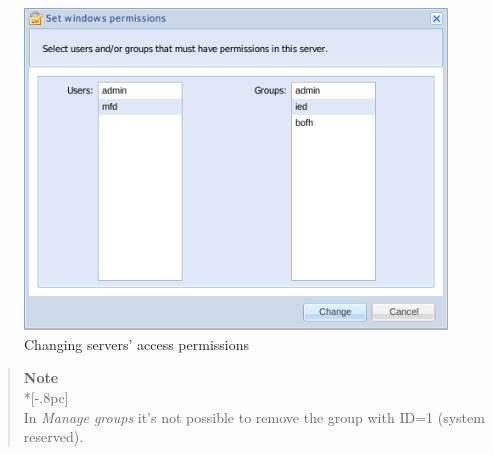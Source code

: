 \begin{figure}[H]
        \begin{center}
        \includegraphics[scale=0.5]{screenshots/permissions/server_window.png}
        \caption{Changing servers' access permissions}
        \label{fig:server_window}
        \end{center}
\end{figure}

\begin{quote}
	{\large \bf Note} \\*[-.8pc]
	\underline{\hspace{6in}} \\    
    In \emph{Manage groups} it's not possible to remove the group with ID=1 (system reserved).
\end{quote}

\pagebreak
